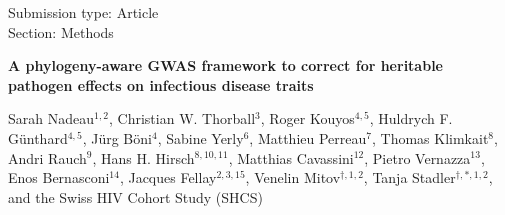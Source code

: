 \documentclass[11pt]{article}
\begin{document}
\begin{flushright} %
Submission type: Article\\
Section: Methods
\end{flushright}

\begin{center}
	\Large{\textbf{A phylogeny-aware GWAS framework to correct for heritable pathogen effects on infectious disease traits}}
\end{center}
\vspace{4pt}

\begin{flushleft}
	Sarah Nadeau$^{1,2}$, Christian W. Thorball$^{3}$, Roger Kouyos$^{4,5}$, Huldrych F. Günthard$^{4,5}$, Jürg Böni$^{4}$, Sabine Yerly$^6$, Matthieu Perreau$^{7}$, Thomas Klimkait$^{8}$, Andri Rauch$^{9}$, Hans H. Hirsch$^{8,10,11}$, Matthias Cavassini$^{12}$, Pietro Vernazza$^{13}$, Enos Bernasconi$^{14}$, Jacques Fellay$^{2,3,15}$, Venelin Mitov$^{\dagger,1,2}$, Tanja Stadler$^{\dagger,\ast,1,2}$, and the Swiss HIV Cohort Study (SHCS)
\end{flushleft}
\end{document}
